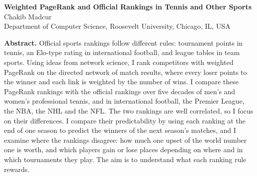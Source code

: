 \documentclass[10pt]{article}
\begin{document}
\begin{center}
{\large\bfseries Weighted PageRank and Official Rankings in Tennis and Other Sports}\\[6pt]
Chakib Madcur\\[2pt]
{\small Department of Computer Science, Roosevelt University, Chicago, IL, USA}
\end{center}
\vspace{0.6em}
\textbf{Abstract.} Official sports rankings follow different rules: tournament points in tennis, an Elo-type rating in international football, and league tables in team sports. Using ideas from network science, I rank competitors with weighted PageRank on the directed network of match results, where every loser points to the winner and each link is weighted by the number of wins. I compare these PageRank rankings with the official rankings over five decades of men's and women's professional tennis, and in international football, the Premier League, the NBA, the NHL and the NFL. The two rankings are well correlated, so I focus on their differences. I compare their predictability by using each ranking at the end of one season to predict the winners of the next season's matches, and I examine where the rankings disagree: how much one upset of the world number one is worth, and which players gain or lose places depending on where and in which tournaments they play. The aim is to understand what each ranking rule rewards.
\end{document}
